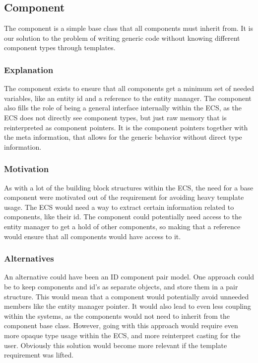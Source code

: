 \subsection{Component}
\label{subsec:detailed_component}
The component is a simple base class that all components must inherit from.
It is our solution to the problem of writing generic code without knowing different component
types through templates.

\subsubsection{Explanation}
The component exists to ensure that all components get a minimum set of needed
variables, like an entity id and a reference to the entity manager.
The component also fills the role of being a general interface
internally within the ECS, as the ECS does not directly see component types,
but just raw memory that is reinterpreted as component pointers.
It is the component pointers together with the meta information,
that allows for the generic behavior without direct type information.

\subsubsection{Motivation}
As with a lot of the building block structures within the ECS, the need for a base component
were motivated out of the requirement for avoiding heavy template usage.
The ECS would need a way to extract certain information related to components,
like their id. The component could potentially need access to the entity manager
to get a hold of other components, so making that a reference
would ensure that all components would have access to it.

\subsubsection{Alternatives}
An alternative could have been an ID component pair model.
One approach could be to keep components and id's as separate objects, and store them in a pair structure.
This would mean that a component would potentially avoid unneeded members like the entity manager pointer.
It would also lead to even less coupling within the systems,
as the components would not need to inherit from the component base class.
However, going with this approach would require even more opaque type usage within the ECS,
and more reinterpret casting for the user.
Obviously this solution would become more relevant if the template requirement was lifted.

